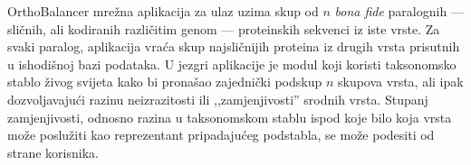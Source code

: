 OrthoBalancer mrežna aplikacija za ulaz uzima skup od $n$ \emph{bona fide}
paralognih --- sličnih, ali kodiranih različitim genom --- proteinskih sekvenci
iz iste vrste. Za svaki paralog, aplikacija vraća skup najsličnijih proteina iz
drugih vrsta prisutnih u ishodišnoj bazi podataka. U jezgri aplikacije je modul
koji koristi taksonomsko stablo živog svijeta kako bi pronašao zajednički
podskup $n$ skupova vrsta, ali ipak dozvoljavajući razinu neizrazitosti ili
,,zamjenjivosti'' srodnih vrsta. Stupanj zamjenjivosti, odnosno razina u
taksonomskom stablu ispod koje bilo koja vrsta može poslužiti kao reprezentant
pripadajućeg podstabla, se može podesiti od strane korisnika.
